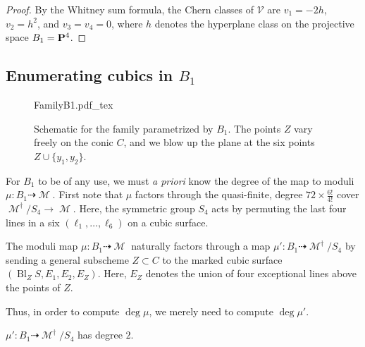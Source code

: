 \documentclass[12pt,reqno]{amsart}
\newcommand{\incfig}[1]{%
    \def\svgwidth{\columnwidth}
    {#1.pdf_tex}
}
\DeclareMathOperator{\Bl}{Bl}
\DeclareMathOperator{\M}{\mathcal{M}}
\renewcommand{\to}{{\longrightarrow}}
\numberwithin{equation}{section}
\newcommand{\V}{\mathcal V}
\begin{document}
\begin{proof}
  By the Whitney sum formula, the Chern classes of $\V$ are
  $v_{1} = -2h$, $v_{2}=h^2$, and $v_{3}= v_{4}=0$, where $h$ denotes
  the hyperplane class on the projective space $B_1 = \P^{4}$.
\end{proof}









\subsection{Enumerating cubics in $B_1$}
\label{sec:enum-cubics-b_1}


\begin{figure}[!]
  \centering
  \incfig{FamilyB1}
  \caption{Schematic for the family parametrized by $B_1$. The points
    $Z$ vary freely on the conic $C$, and we blow up the plane at the
    six points $Z \cup \{y_{1},y_{2}\}$.}
    \label{fig:FamilyB1}
\end{figure}


For $B_1$ to be of any use, we must {\sl a priori} know the degree of
the map to moduli $\mu: B_1 \dashrightarrow \M$.  First note that
$\mu$ factors through the quasi-finite, degree
$72 \times \frac{6!}{4!}$ cover $\M^{\dagger}/S_{4} \to \M$.  Here,
the symmetric group $S_4$ acts by permuting the last four lines in a
six $(\ell_{1}, \dots, \ell_{6})$ on a cubic surface.


The moduli map $\mu: B_{1} \dashrightarrow \M$ naturally factors
through a map $\mu': B_1 \dashrightarrow \M^{\dagger}/S_{4}$ by
sending a general subscheme $Z \subset C$ to the marked cubic surface
$(\Bl_{Z}S, E_1, E_2, E_{Z})$. Here, $E_Z$ denotes the union of four
exceptional lines above the points of $Z$.


Thus, in order to compute $\deg \mu$, we merely need to compute
$\deg \mu'$.

  \begin{lemma}
    \label{lemma:degreemudaggerB1}
    $\mu': B_1 \dashrightarrow \M^{\dagger}/S_{4}$ has degree $2$.
  \end{lemma}
\end{document}
